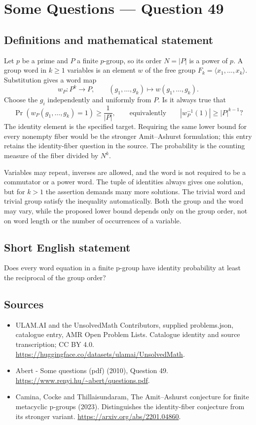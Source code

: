 \documentclass[11pt,a4paper]{article}
\begin{document}
\section*{Some Questions — Question 49}\label{statement}

\subsection{Definitions and mathematical statement}
Let $p$ be a prime and $P$ a finite $p$-group, so its order $N=|P|$ is a power of $p$. A group word in $k\geq1$ variables is an element $w$ of the free group $F_k=\langle x_1,\ldots,x_k\rangle$. Substitution gives a word map
\[
 w_P:P^k\longrightarrow P,\qquad
 (g_1,\ldots,g_k)\longmapsto w(g_1,\ldots,g_k).
\]
Choose the $g_i$ independently and uniformly from $P$. Is it always true that
\[
 \Pr(w_P(g_1,\ldots,g_k)=1)\geq\frac1{|P|},
 \qquad\text{equivalently}\qquad |w_P^{-1}(1)|\geq |P|^{k-1}?
\]
The identity element is the specified target. Requiring the same lower bound for every nonempty fiber would be the stronger Amit--Ashurst formulation; this entry retains the identity-fiber question in the source. The probability is the counting measure of the fiber divided by $N^k$.

Variables may repeat, inverses are allowed, and the word is not required to be a commutator or a power word. The tuple of identities always gives one solution, but for $k>1$ the assertion demands many more solutions. The trivial word and trivial group satisfy the inequality automatically. Both the group and the word may vary, while the proposed lower bound depends only on the group order, not on word length or the number of occurrences of a variable.
\subsection{Short English statement}
Does every word equation in a finite p-group have identity probability at least the reciprocal of the group order?
\subsection{Sources}
\begin{itemize}
\item[S1] ULAM.AI and the UnsolvedMath Contributors, supplied problems.json, catalogue entry, AMR Open Problem Lists. Catalogue identity and source transcription; CC BY 4.0.
\url{https://huggingface.co/datasets/ulamai/UnsolvedMath}.
\item[S2] Abert - Some questions (pdf) (2010), Question 49. 
\url{https://www.renyi.hu/~abert/questions.pdf}.
\item[S3] Camina, Cocke and Thillaisundaram, The Amit--Ashurst conjecture for finite metacyclic p-groups (2023). Distinguishes the identity-fiber conjecture from its stronger variant.
\url{https://arxiv.org/abs/2201.04860}.
\end{itemize}
\end{document}
